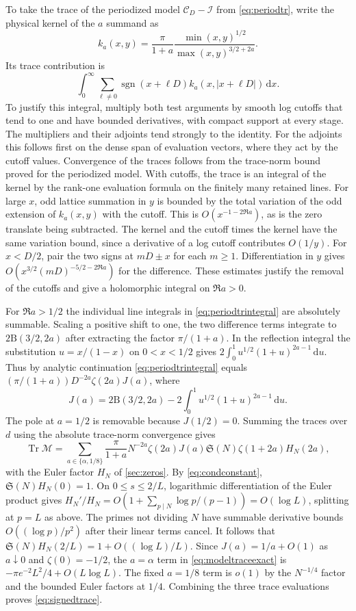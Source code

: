 \documentclass[11pt,a4paper]{article}
\numberwithin{equation}{section}
\newcommand{\SSS}{\mathfrak S}
\newcommand{\ud}{\mathrm d}
\begin{document}
To take the trace of the periodized model
$\mathcal C_D-\mathcal I$ from \cref{eq:periodtr},
write the physical kernel of the $a$ summand as
\[
 k_a(x,y)=\frac{\pi}{1+a}
        \frac{\min(x,y)^{1/2}}{\max(x,y)^{3/2+2a}} .
\]
Its trace contribution is
\begin{equation}
 \int_0^\infty \sum_{\ell\ne0}
        \operatorname{sgn}(x+\ell D)k_a(x,|x+\ell D|)
                   \,\ud x .
 \label{eq:periodtrintegral}
\end{equation}
To justify this integral, multiply both test arguments
by smooth log cutoffs that tend to one and have bounded
derivatives, with compact support at every stage. The
multipliers and their adjoints tend strongly to the identity.
For the adjoints this follows first on the dense span of
evaluation vectors, where they act by the cutoff values.
Convergence of the traces follows from the trace-norm
bound proved for the periodized model. With cutoffs, the
trace is an integral of the kernel by the rank-one
evaluation formula on the finitely many retained lines.
For large $x$, odd lattice summation in $y$ is bounded
by the total variation of the odd extension of $k_a(x,y)$
with the cutoff. This is $O(x^{-1-2\Re a})$, as is the
zero translate being subtracted. The kernel and the
cutoff times the kernel have the same variation bound,
since a derivative of a log cutoff contributes $O(1/y)$.
For $x<D/2$, pair the two signs at $mD\pm x$ for each
$m\ge1$. Differentiation in $y$ gives
$O(x^{3/2}(mD)^{-5/2-2\Re a})$ for the difference.
These estimates justify the removal of the cutoffs and
give a holomorphic integral on $\Re a>0$.

For $\Re a>1/2$ the individual line integrals in
\cref{eq:periodtrintegral} are absolutely summable. Scaling
a positive shift to one, the two difference terms integrate
to $2\mathrm B(3/2,2a)$ after extracting the factor
$\pi/(1+a)$. In the reflection integral the substitution
$u=x/(1-x)$ on $0<x<1/2$ gives
$2\int_0^1 u^{1/2}(1+u)^{2a-1}\,\ud u$.
Thus by analytic continuation \cref{eq:periodtrintegral}
equals $(\pi/(1+a))D^{-2a}\zeta(2a)J(a)$, where
\[
 J(a)=2\mathrm B(3/2,2a)-2\int_0^1 u^{1/2}(1+u)^{2a-1}\,\ud u.
\]
The pole at $a=1/2$ is removable because $J(1/2)=0$.
Summing the traces over $d$ using the absolute
trace-norm convergence gives
\begin{equation}
 \operatorname{Tr}\mathcal M
  =\sum_{a\in\{\alpha,1/8\}}\frac{\pi}{1+a}
      N^{-2a}\zeta(2a)J(a)\SSS(N)\zeta(1+2a)H_N(2a),
 \label{eq:modeltraceexact}
\end{equation}
with the Euler factor $H_N$ of \cref{sec:zeros}.
By \cref{eq:condconstant}, $\SSS(N)H_N(0)=1$. On
$0\le s\le2/L$, logarithmic differentiation of the Euler
product gives $H_N'/H_N=O(1+\sum_{p\mid N}\log p/(p-1))
=O(\log L)$, splitting at $p=L$ as above. The primes
not dividing $N$ have summable derivative bounds
$O((\log p)/p^2)$ after their linear terms cancel.
It follows that $\SSS(N)H_N(2/L)=1+O((\log L)/L)$.
Since $J(a)=1/a+O(1)$ as $a\downarrow0$ and $\zeta(0)=-1/2$,
the $a=\alpha$ term in \cref{eq:modeltraceexact} is
$-\pi e^{-2}L^2/4+O(L\log L)$. The fixed $a=1/8$
term is $o(1)$ by the $N^{-1/4}$ factor and the bounded
Euler factors at $1/4$. Combining the three trace evaluations
proves \cref{eq:signedtrace}.
\end{document}
